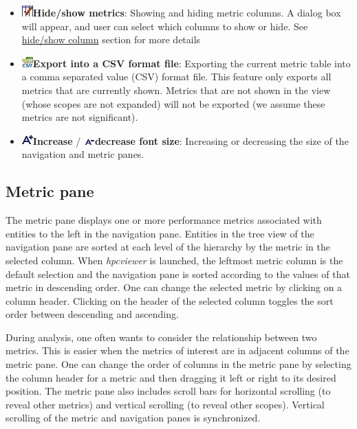 \documentclass[a4paper,11pt]{article}
\begin{document}
\begin{itemize}
	\item 
\includegraphics{images/checkColumns.gif}\textbf{Hide/show metrics}: Showing and hiding metric columns.   A dialog box will appear, and user can select which columns to show or hide. See \hyperlink{hideshowcolumn}{hide/show column} section for more details 
	\item 
\includegraphics{images/savecsv.gif}\textbf{Export into a CSV format file}: Exporting the current metric table into a comma separated value (CSV) format file.  This feature only exports all metrics that are currently shown.  Metrics that are not shown in the view (whose scopes are not expanded) will not be exported (we assume these metrics are not significant).    
	\item 
\includegraphics{images/FontBigger.gif}\textbf{Increase} / 
\includegraphics{images/FontSmaller.gif}\textbf{decrease font size}: Increasing or decreasing the size of the navigation and metric panes.  
\end{itemize}

\subsection{Metric pane} The metric pane displays one or more performance metrics associated with entities to the left in the navigation pane. Entities  in the tree view of the navigation pane are sorted at each level of the  hierarchy by the metric in the selected column. When \textit{hpcviewer} is  launched, the leftmost metric column is the default selection and the  navigation pane is sorted according to the values of that metric in descending order. One can change the selected metric by clicking on a  column header. Clicking on the header of the selected column toggles  the sort order between descending and ascending.  

 During analysis, one often wants to consider the relationship between  two metrics. This is easier when the metrics of interest are in adjacent  columns of the metric pane. One can change the order of columns in  the metric pane by selecting the column header for a metric and then  dragging it left or right to its desired position. The metric pane also  includes scroll bars for horizontal scrolling (to reveal other metrics)  and vertical scrolling (to reveal other scopes). Vertical scrolling of the  metric and navigation panes is synchronized. 
\end{document}
